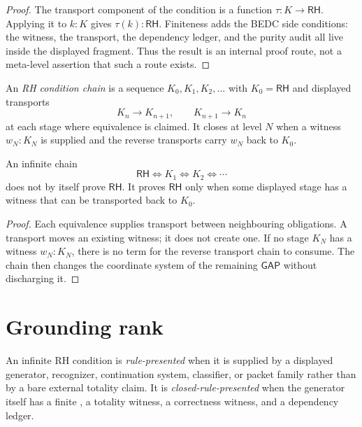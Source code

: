 \begin{proof}
The transport component of the condition is a function
$\tau : K \to \mathsf{RH}$.  Applying it to $k:K$ gives
$\tau(k):\mathsf{RH}$.  Finiteness adds the BEDC side conditions: the
witness, the transport, the dependency ledger, and the purity audit all live
inside the displayed fragment.  Thus the result is an internal proof route,
not a meta-level assertion that such a route exists.
\end{proof}

\begin{definition}
\label{def:rh-condition-chain}
An \emph{RH condition chain} is a sequence $K_0,K_1,K_2,\ldots$ with
$K_0=\mathsf{RH}$ and displayed transports
$$
K_n \to K_{n+1},
\qquad
K_{n+1} \to K_n
$$
at each stage where equivalence is claimed.  It closes at level $N$ when a
witness $w_N:K_N$ is supplied and the reverse transports carry $w_N$ back to
$K_0$.
\end{definition}

\begin{theorem}
\label{thm:rh-equivalence-chain-transports-obligations}
An infinite chain
$$
\mathsf{RH} \Longleftrightarrow K_1
\Longleftrightarrow K_2
\Longleftrightarrow \cdots
$$
does not by itself prove $\mathsf{RH}$.  It proves $\mathsf{RH}$ only when
some displayed stage has a witness that can be transported back to
$K_0$.
\end{theorem}

\begin{proof}
Each equivalence supplies transport between neighbouring obligations.  A
transport moves an existing witness; it does not create one.  If no stage
$K_N$ has a witness $w_N:K_N$, there is no term for the reverse transport
chain to consume.  The chain then changes the coordinate system of the
remaining $\mathsf{GAP}$ without discharging it.
\end{proof}

\section{Grounding rank}
\label{sec:rh-route-grounding-rank}

\begin{definition}
\label{def:rh-rule-presented-condition}
An infinite RH condition is \emph{rule-presented} when it is supplied by a
displayed generator, recognizer, continuation system, classifier, or packet
family rather than by a bare external totality claim.  It is
\emph{closed-rule-presented} when the generator itself has a finite
\NameCert{}, a totality witness, a correctness witness, and a dependency
ledger.
\end{definition}

